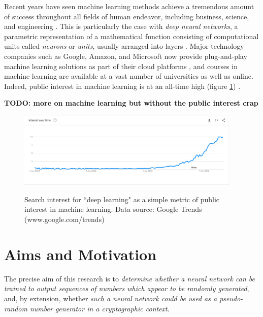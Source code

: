 \documentclass[12pt, titlepage]{report}
\theoremstyle{definition}
\begin{document}
Recent years have seen machine learning methods achieve a tremendous amount of success throughout all fields of human endeavor, including business, science, and engineering \cite[p. 24-29]{russel2009artificial}. This is particularly the case with \emph{deep neural networks}, a parametric representation of a mathematical function consisting of computational units called \emph{neurons} or \emph{units}, usually arranged into layers \cite[p. 731-732]{russel2009artificial}. Major technology companies such as Google, Amazon, and Microsoft now provide plug-and-play machine learning solutions as part of their cloud platforms \cite{google2018automl} \cite{amazon2018aws} \cite{microsoft2018azure}, and courses in machine learning are available at a vast number of universities as well as online. Indeed, public interest in machine learning is at an all-time high (figure \ref{figure:googletrends_dl}) \cite{forbes2016short}.

\textbf{TODO: more on machine learning but without the public interest crap}


\begin{figure}
\centering
\includegraphics[width=0.95\textwidth]{img/google_trends_dl.png}\\
\caption{Search interest for ``deep learning" as a simple metric of public interest in machine learning. Data source: Google Trends (www.google.com/trends) \cite{google2018trends}}
\label{figure:googletrends_dl}
\end{figure}


\section{Aims and Motivation}\label{subsection:aims}
The precise aim of this research is to \emph{determine whether a neural network can be trained to output sequences of numbers which appear to be randomly generated}, and, by extension, whether \emph{such a neural network could be used as a pseudo-random number generator in a cryptographic context}. 
\end{document}
